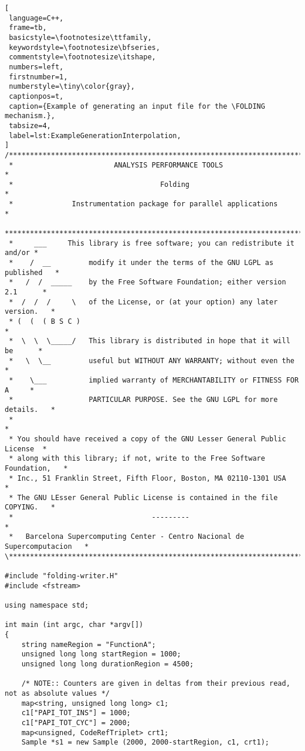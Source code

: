 \begin{lstlisting}[
 language=C++,
 frame=tb,
 basicstyle=\footnotesize\ttfamily,
 keywordstyle=\footnotesize\bfseries,
 commentstyle=\footnotesize\itshape,
 numbers=left,
 firstnumber=1,
 numberstyle=\tiny\color{gray},
 captionpos=t,
 caption={Example of generating an input file for the \FOLDING mechanism.},
 tabsize=4,
 label=lst:ExampleGenerationInterpolation,
]
/*****************************************************************************\
 *                        ANALYSIS PERFORMANCE TOOLS                         *
 *                                   Folding                                 *
 *              Instrumentation package for parallel applications            *
 *****************************************************************************
 *     ___     This library is free software; you can redistribute it and/or *
 *    /  __         modify it under the terms of the GNU LGPL as published   *
 *   /  /  _____    by the Free Software Foundation; either version 2.1      *
 *  /  /  /     \   of the License, or (at your option) any later version.   *
 * (  (  ( B S C )                                                           *
 *  \  \  \_____/   This library is distributed in hope that it will be      *
 *   \  \__         useful but WITHOUT ANY WARRANTY; without even the        *
 *    \___          implied warranty of MERCHANTABILITY or FITNESS FOR A     *
 *                  PARTICULAR PURPOSE. See the GNU LGPL for more details.   *
 *                                                                           *
 * You should have received a copy of the GNU Lesser General Public License  *
 * along with this library; if not, write to the Free Software Foundation,   *
 * Inc., 51 Franklin Street, Fifth Floor, Boston, MA 02110-1301 USA          *
 * The GNU LEsser General Public License is contained in the file COPYING.   *
 *                                 ---------                                 *
 *   Barcelona Supercomputing Center - Centro Nacional de Supercomputacion   *
\*****************************************************************************/

#include "folding-writer.H"
#include <fstream>

using namespace std;

int main (int argc, char *argv[])
{
	string nameRegion = "FunctionA";
	unsigned long long startRegion = 1000;
	unsigned long long durationRegion = 4500;

	/* NOTE:: Counters are given in deltas from their previous read, not as absolute values */
	map<string, unsigned long long> c1;
	c1["PAPI_TOT_INS"] = 1000;
	c1["PAPI_TOT_CYC"] = 2000;
	map<unsigned, CodeRefTriplet> crt1;
	Sample *s1 = new Sample (2000, 2000-startRegion, c1, crt1);


\end{lstlisting}
